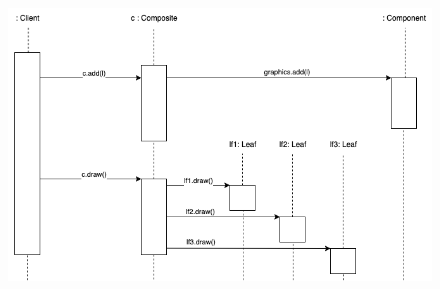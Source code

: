 \begin{figure}[H]
    \centering
    \includegraphics[width=1\linewidth]{assets/pattern/composite/composite-sequence.drawio.png}
\end{figure}

\newpage